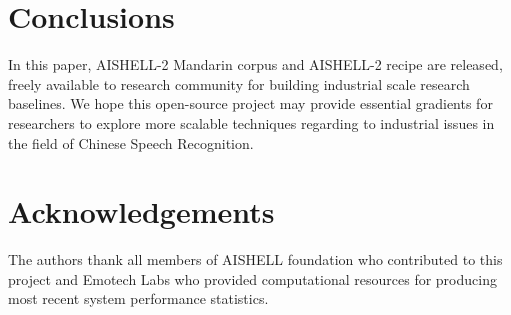 \documentclass[a4paper]{article}
\begin{document}
% 

\section{Conclusions}

In this paper, AISHELL-2 Mandarin corpus and AISHELL-2 recipe are released,
freely available to research community for building industrial scale research
baselines. We hope this open-source project may provide essential gradients for
researchers to explore more scalable techniques regarding to industrial issues in the field of Chinese Speech Recognition.

\section{Acknowledgements}

The authors thank all members of AISHELL foundation who contributed to this project and Emotech Labs who provided computational resources for producing most recent system performance statistics.





\end{document}
